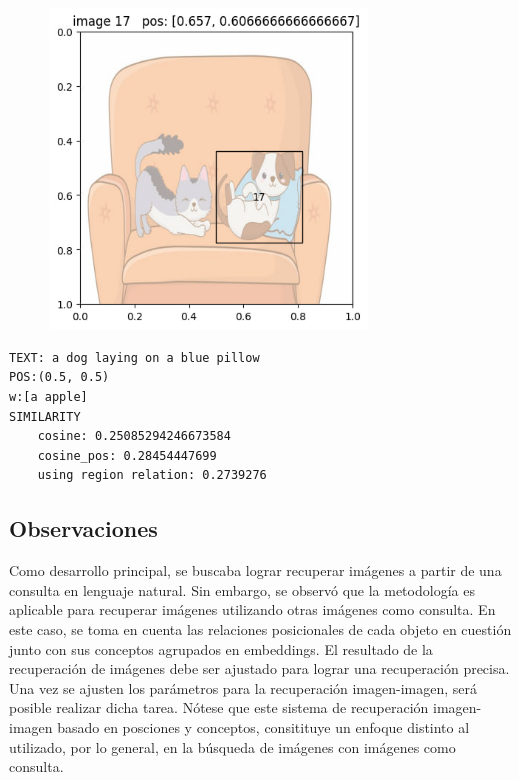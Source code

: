 \begin{figure}[H]
\centering
 \includegraphics[height=85mm]{Graphics/dog_pillow.jpg}
 \caption{ }
 \label{fig:dogs_pillow}
\end{figure}
\begin{verbatim}
TEXT: a dog laying on a blue pillow
POS:(0.5, 0.5)
w:[a apple]
SIMILARITY
    cosine: 0.25085294246673584
    cosine_pos: 0.28454447699
    using region relation: 0.2739276
\end{verbatim}


\subsection{Observaciones}
Como desarrollo principal, se buscaba lograr recuperar im\'agenes a partir de una consulta en lenguaje natural. Sin embargo, se observó que la metodología es aplicable para recuperar im\'agenes utilizando otras im\'agenes como consulta. En este caso, se toma en cuenta las relaciones posicionales de cada objeto en cuestión junto con sus conceptos agrupados en embeddings. El resultado de la recuperación de im\'agenes debe ser ajustado para lograr una recuperación precisa. Una vez se ajusten los par\'ametros para la recuperación imagen-imagen, ser\'a posible realizar dicha tarea. N\'otese que este sistema de recuperaci\'on imagen-imagen basado en posciones y conceptos, consitituye un enfoque distinto al utilizado, por lo general, en la b\'usqueda de im\'agenes con im\'agenes como consulta.


